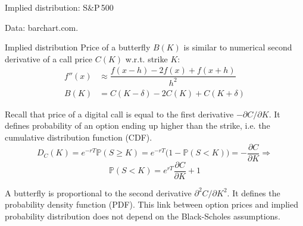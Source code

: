 \documentclass{beamer}
\begin{document}
\begin{frame}{Implied distribution: S\&P\,500}
\centering
{}

\scriptsize Data: barchart.com.
\end{frame}



\begin{frame}{Implied distribution}
\justify
Price of a butterfly $B(K)$ is similar to numerical second derivative of a call price $C(K)$ w.r.t. strike $K$:
\begin{align*}
f''(x) &\approx \dfrac{f(x - h) - 2f(x) + f(x+h)}{h^2} \\
B(K) &= C(K-\delta) - 2C(K) + C(K+\delta)
\end{align*}

\justify
Recall that price of a digital call is equal to the first derivative $-\partial C/\partial K$. It defines probability of an option ending up higher than the strike, i.e. the \alert{cumulative distribution function (CDF)}.
\begin{equation*}
D_C(K) = e^{-rT}\mathbb{P}(S \ge K) = e^{-rT}\Big(1 - \mathbb{P}(S < K)\Big) = -\dfrac{\partial C}{\partial K} \Rightarrow
\end{equation*}
\begin{equation*}
\mathbb{P}(S < K) = e^{rT}\dfrac{\partial C}{\partial K} + 1
\end{equation*}

\justify
A butterfly is proportional to the second derivative $\partial^2C/\partial K^2$. It defines the \alert{probability density function (PDF)}. This link between option prices and implied probability distribution does not depend on the Black-Scholes assumptions.
\end{frame}
\end{document}
